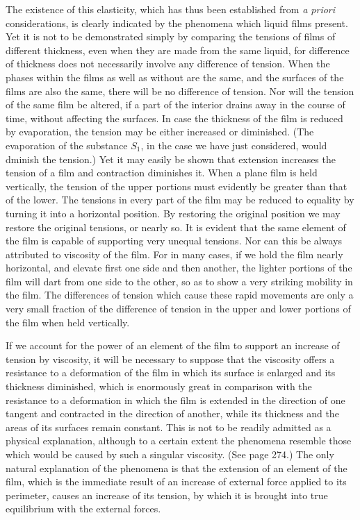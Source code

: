 \documentclass[12pt]{memoir}
\begin{document}
The existence of this elasticity, which has thus been established from \textit{a priori} considerations, is clearly indicated by the phenomena which liquid films present. Yet it is not to be demonstrated simply by comparing the tensions of films of different thickness, even when they are made from the same liquid, for difference of thickness does not necessarily involve any difference of tension. When the phases within the films as well as without are the same, and the surfaces of the films are also the same, there will be no difference of tension. Nor will the tension of the same film be altered, if a part of the interior drains away in the course of time, without affecting the surfaces. In case the thickness of the film is reduced by evaporation, the tension may be either increased or diminished. (The evaporation of the substance $S_1$, in the case we have just considered, would dminish the tension.) Yet it may easily be shown that extension increases the tension of a film and contraction diminishes it. When a plane film is held vertically, the tension of the upper portions must evidently be greater than that of the lower. The tensions in every part of the film may be reduced to equality by turning it into a horizontal position. By restoring the original position we may restore the original tensions, or nearly so. It is evident that the same element of the film is capable of supporting very unequal tensions. Nor can this be always attributed to viscosity of the film. For in many cases, if we hold the film nearly horizontal, and elevate first one side and then another, the lighter portions of the film will dart from one side to the other, so as to show a very striking mobility in the film. The differences of tension which cause these rapid movements are only a very small fraction of the difference of tension in the upper and lower portions of the film when held vertically.

If we account for the power of an element of the film to support an increase of tension by viscosity, it will be necessary to suppose that the viscosity offers a resistance to a deformation of the film in which its surface is enlarged and its thickness diminished, which is enormously great in comparison with the resistance to a deformation in which the film is extended in the direction of one tangent and contracted in the direction of another, while its thickness and the areas of its surfaces remain constant. This is not to be readily admitted as a physical explanation, although to a certain extent the phenomena resemble those which would be caused by such a singular viscosity. (See page 274.) The only natural explanation of the phenomena is that the extension of an element of the film, which is the immediate result of an increase of external force applied to its perimeter, causes an increase of its tension, by which it is brought into true equilibrium with the external forces.
\end{document}
